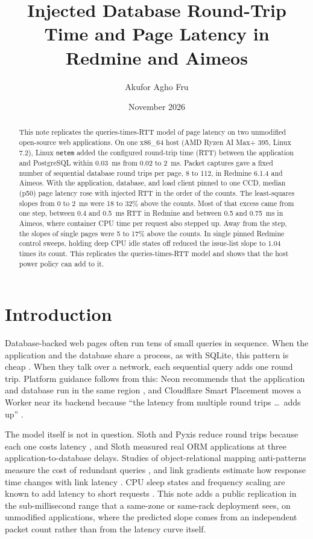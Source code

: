\documentclass[11pt]{article}
\title{Injected Database Round-Trip Time and Page Latency in Redmine and Aimeos}
\author{Akufor Agho Fru}
\date{November 2026}
\begin{document}
\maketitle

\begin{abstract}
This note replicates the queries-times-RTT model of page latency on two unmodified
open-source web applications. On one x86\_64 host (AMD Ryzen AI Max+ 395, Linux 7.2), Linux
\texttt{netem} added the configured round-trip time (RTT) between the application and
PostgreSQL within 0.03~ms from 0.02 to 2~ms. Packet captures gave a fixed number of sequential
database round trips per page, 8 to 112, in Redmine 6.1.4 and Aimeos. With the application,
database, and load client pinned to one CCD, median (p50) page latency rose with injected RTT
in the order of the counts. The least-squares slopes from 0 to 2~ms were 18 to 32\% above the
counts. Most of that excess came from one step, between 0.4 and 0.5~ms RTT in Redmine and
between 0.5 and 0.75~ms in Aimeos, where container CPU time per request also stepped up. Away
from the step, the slopes of single pages were 5 to 17\% above the counts. In single pinned
Redmine control sweeps, holding deep CPU idle states off reduced the issue-list slope to 1.04
times its count. This replicates the queries-times-RTT model and shows that the host power
policy can add to it.
\end{abstract}

\section{Introduction}

Database-backed web pages often run tens of small queries in sequence. When the application
and the database share a process, as with SQLite, this pattern is cheap
\citep{sqlite2026smallqueries}. When they talk over a network, each sequential query adds one
round trip. Platform guidance follows from this: Neon recommends that the application and
database run in the same region \citep{neon2026latency}, and Cloudflare Smart Placement moves
a Worker near its backend because ``the latency from multiple round trips \ldots\ adds up''
\citep{cloudflare2026placement}.

The model itself is not in question. Sloth and Pyxis reduce round trips because each one
costs latency \citep{cheung2014sloth,cheung2012pyxis}, and Sloth measured real ORM
applications at three application-to-database delays. Studies of object-relational mapping
anti-patterns measure the cost of redundant queries \citep{chen2014orm,chen2016redundant,
yang2018hownot}, and link gradients estimate how response time changes with link latency
\citep{chen2011linkgradients}. CPU sleep states and frequency scaling are known to add latency
to short requests \citep{kanev2014tradeoffs,li2014tales,chou2019udpm,hajyahya2022agilewatts,
antoniou2022agilepkgc}. This note adds a public replication in the sub-millisecond range that
a same-zone or same-rack deployment sees, on unmodified applications, where the predicted
slope comes from an independent packet count rather than from the latency curve itself.
\end{document}
